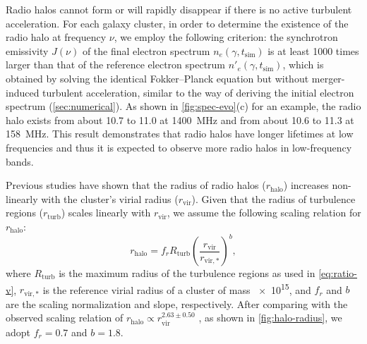 \documentclass[twocolumn]{aastex62}
\newcommand{\R}[1]{\mathrm{#1}}
\newcommand{\editone}[1]{{\leavevmode\color{cyan}#1}}
\begin{document}
\editone{%
Radio halos cannot form or will rapidly disappear if there is no active
turbulent acceleration.
For each galaxy cluster, in order to determine the existence of the radio
halo at frequency $\nu$, we employ the following criterion:
the synchrotron emissivity $J(\nu)$ of the final electron spectrum
$n_e(\gamma, t_{\R{sim}})$ is at least \num{1000} times larger than that of
the reference electron spectrum $n'_e(\gamma, t_{\R{sim}})$, which is
obtained by solving the identical Fokker--Planck equation but without
merger-induced turbulent acceleration, similar to the way of deriving the
initial electron spectrum (\autoref{sec:numerical}).
As shown in \autoref{fig:spec-evo}(c) for an example, the radio halo exists
from about 10.7 to 11.0 \si{\Gyr} at \SI{1400}{\MHz} and
from about 10.6 to 11.3 \si{\Gyr} at \SI{158}{\MHz}.
This result demonstrates that radio halos have longer lifetimes at low
frequencies and thus it is expected to observe more radio halos in
low-frequency bands.

Previous studies \citep[e.g.,][]{cassano2007,basu2012}
have shown that the radius of radio halos ($r_{\R{halo}}$)
increases non-linearly with the cluster's virial radius ($r_{\R{vir}}$).
Given that the radius of turbulence regions ($r_{\R{turb}}$) scales
linearly with $r_{\R{vir}}$, we assume the following scaling relation for
$r_{\R{halo}}$:
\begin{equation}
  \label{eq:r-halo}
  r_{\R{halo}} = f_r R_{\R{turb}}
    \left( \frac{r_{\R{vir}}}{r_{\R{vir,*}}} \right)^b ,
\end{equation}
where
$R_{\R{turb}}$ is the maximum radius of the turbulence regions as used in
\autoref{eq:ratio-v},
$r_{\R{vir,*}}$ is the reference virial radius of a cluster of mass
\SI{e15}{\solarmass},
and $f_r$ and $b$ are the scaling normalization and slope, respectively.
After comparing with the observed scaling relation of
$r_{\R{halo}} \propto r_{\R{vir}}^{2.63 \pm 0.50}$ \citep{cassano2007},
as shown in \autoref{fig:halo-radius},
we adopt $f_r = 0.7$ and $b = 1.8$.
} %
\end{document}
